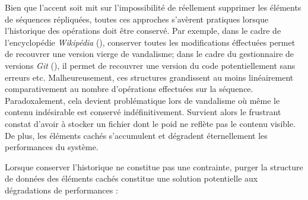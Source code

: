 Bien que l'accent soit mit sur l'impossibilité de réellement supprimer les
éléments de séquences répliquées, toutes ces approches s'avèrent pratiques
lorsque l'historique des opérations doit être conservé. Par exemple, dans le
cadre de l'encyclopédie \emph{Wikipédia} (\REF), conserver toutes les
modifications éffectuées permet de recouvrer une version vierge de vandalisme;
dans le cadre du gestionnaire de versions \emph{Git} (\REF), il permet de
recouvrer une version du code potentiellement sans erreurs etc. Malheureusement,
ces structures grandissent au moins linéairement comparativement au nombre
d'opérations effectuées sur la séquence. Paradoxalement, cela devient
problématique lors de vandalisme où même le contenu indésirable est conservé
indéfinitivement. Survient alors le frustrant constat d'avoir à stocker un
fichier dont le poid ne reflète pas le contenu visible. De plus, les éléments
cachés s'accumulent et dégradent éternellement les performances du système.

Lorsque conserver l'historique ne constitue pas une contrainte, purger la
structure de données des éléments cachés constitue une solution potentielle aux
dégradations de performances :


